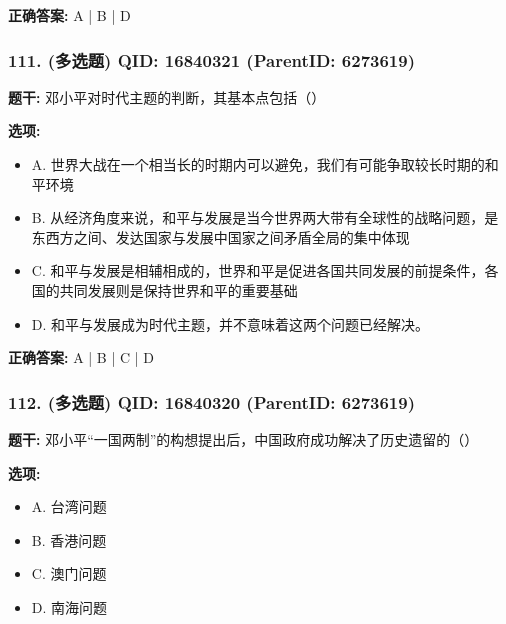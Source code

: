 \documentclass[12pt,UTF8]{ctexart}
\begin{document}
\textbf{正确答案:}
A | B | D

\vspace{0.3em}\hrulefill\vspace{0.7em}

\subsubsection*{111. (多选题) \small QID: 16840321 (ParentID: 6273619)}

\textbf{题干:}
邓小平对时代主题的判断，其基本点包括（）



\textbf{选项:}
\begin{itemize}[leftmargin=*]

  \item A. 世界大战在一个相当长的时期内可以避免，我们有可能争取较长时期的和平环境

  \item B. 从经济角度来说，和平与发展是当今世界两大带有全球性的战略问题，是东西方之间、发达国家与发展中国家之间矛盾全局的集中体现

  \item C. 和平与发展是相辅相成的，世界和平是促进各国共同发展的前提条件，各国的共同发展则是保持世界和平的重要基础

  \item D. 和平与发展成为时代主题，并不意味着这两个问题已经解决。

\end{itemize}

\textbf{正确答案:}
A | B | C | D

\vspace{0.3em}\hrulefill\vspace{0.7em}

\subsubsection*{112. (多选题) \small QID: 16840320 (ParentID: 6273619)}

\textbf{题干:}
邓小平“一国两制”的构想提出后，中国政府成功解决了历史遗留的（）



\textbf{选项:}
\begin{itemize}[leftmargin=*]

  \item A. 台湾问题

  \item B. 香港问题

  \item C. 澳门问题

  \item D. 南海问题

\end{itemize}
\end{document}
